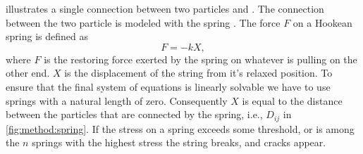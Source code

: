 
 illustrates a single connection between two particles  and . The connection between the two particle is modeled with the spring . The force $F$ on a Hookean spring is defined as
\begin{equation}\label{eq:method:hookeslaw}
	F = -k X,	
\end{equation}
where $F$ is the restoring force exerted by the spring on whatever is pulling on the other end. $X$ is the displacement of the string from it's relaxed position. To ensure that the final system of equations is linearly solvable we have to use springs with a natural length of zero. Consequently $X$ is equal to the distance between the particles that are connected by the spring, i.e., $D_{ij}$ in \cref{fig:method:spring}. If the stress on a spring exceeds some threshold, or is among the $n$ springs with the highest stress the string breaks, and cracks appear.


